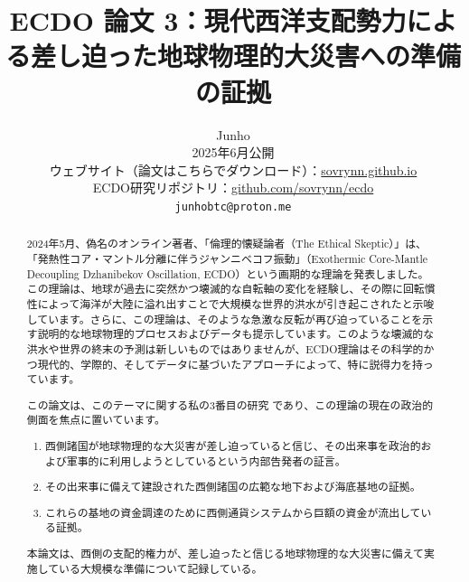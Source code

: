 \documentclass[10pt,twocolumn,letterpaper]{article}
\begin{document}
\title{ECDO 論文 3：現代西洋支配勢力による差し迫った地球物理的大災害への準備の証拠}

\author{Junho\\
2025年6月公開\\
ウェブサイト（論文はこちらでダウンロード）：\href{https://sovrynn.github.io}{sovrynn.github.io}\\
ECDO研究リポジトリ：\href{https://github.com/sovrynn/ecdo}{github.com/sovrynn/ecdo}\\
{\tt\small junhobtc@proton.me}
}

\maketitle

\begin{abstract}
2024年5月、偽名のオンライン著者、「倫理的懐疑論者（The Ethical Skeptic）」\cite{0}は、「発熱性コア・マントル分離に伴うジャンニベコフ振動」（Exothermic Core-Mantle Decoupling Dzhanibekov Oscillation, ECDO）\cite{1}という画期的な理論を発表しました。この理論は、地球が過去に突然かつ壊滅的な自転軸の変化を経験し、その際に回転慣性によって海洋が大陸に溢れ出すことで大規模な世界的洪水が引き起こされたと示唆しています。さらに、この理論は、そのような急激な反転が再び迫っていることを示す説明的な地球物理的プロセスおよびデータも提示しています。このような壊滅的な洪水や世界の終末の予測は新しいものではありませんが、ECDO理論はその科学的かつ現代的、学際的、そしてデータに基づいたアプローチによって、特に説得力を持っています。

この論文は、このテーマに関する私の3番目の研究 \cite{2,3} であり、この理論の現在の政治的側面を焦点に置いています。
\begin{flushleft}
\begin{enumerate}
    \item 西側諸国が地球物理的な大災害が差し迫っていると信じ、その出来事を政治的および軍事的に利用しようとしているという内部告発者の証言。
    \item その出来事に備えて建設された西側諸国の広範な地下および海底基地の証拠。
    \item これらの基地の資金調達のために西側通貨システムから巨額の資金が流出している証拠。
\end{enumerate}
\end{flushleft}

本論文は、西側の支配的権力が、差し迫ったと信じる地球物理的な大災害に備えて実施している大規模な準備について記録している。
\end{abstract}
\end{document}
